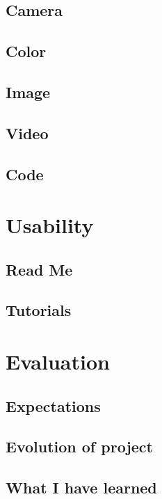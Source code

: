 \documentclass[a4paper]{report}
\begin{document}
\subsection{Camera}
\subsection{Color}
\subsection{Image}
\subsection{Video}
\subsection{Code}

\section{Usability}
\subsection{Read Me}
\subsection{Tutorials}

\section{Evaluation}
\subsection{Expectations}
\subsection{Evolution of project}
\subsection{What I have learned}




\end{document}
